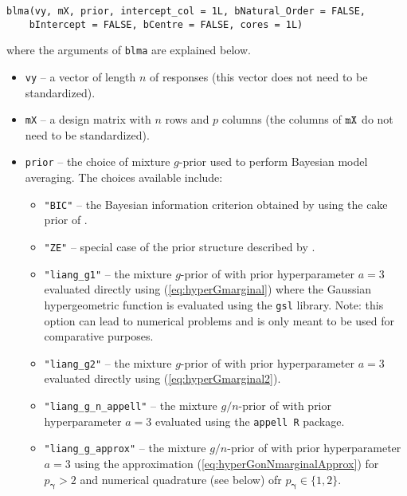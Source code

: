 \documentclass[12pt]{article}
\def\vectorfonttwo{\boldsymbol}
\def\vgamma{{\vectorfonttwo \gamma}}             %
\begin{document}
\begin{verbatim}
blma(vy, mX, prior, intercept_col = 1L, bNatural_Order = FALSE, 
    bIntercept = FALSE, bCentre = FALSE, cores = 1L)
\end{verbatim}

\noindent where the arguments of {\tt blma}
are explained below.
\begin{itemize}
	\item {\tt vy} -- a vector of length $n$ of responses (this vector does not need to be standardized).
	
	\item {\tt mX} -- a design matrix with $n$ rows and $p$ columns (the columns of ${\tt mX}$ do not need to be standardized).
	
	\item {\tt prior} -- the choice of mixture $g$-prior used to perform Bayesian model averaging. The choices available include:
	\begin{itemize}
		\item {\tt "BIC"} -- the Bayesian information criterion obtained by using the cake prior 
		of \cite{OrmerodEtal2017}. 
		
		\item {\tt "ZE"} -- special case of the prior structure described by \cite{Maruyama2011}.
		
		\item {\tt "liang\_g1"} -- the mixture $g$-prior of \cite{Liang2008} with prior hyperparameter $a=3$
		evaluated directly using (\ref{eq:hyperGmarginal}) where the Gaussian hypergeometric function is evaluated using the {\tt gsl} library. Note: this option can lead to numerical problems and is only meant to be used for comparative purposes.
		
		\item {\tt "liang\_g2"} -- the mixture $g$-prior of \cite{Liang2008} with prior hyperparameter $a=3$
		evaluated directly using (\ref{eq:hyperGmarginal2}).
		
		\item {\tt "liang\_g\_n\_appell"} -- the mixture $g/n$-prior of \cite{Liang2008} with prior hyperparameter $a=3$ evaluated using the {\tt appell R} package.
		
		\item {\tt "liang\_g\_approx"} -- the mixture $g/n$-prior of \cite{Liang2008} with prior hyperparameter $a=3$ using the approximation (\ref{eq:hyperGonNmarginalApprox}) for $p_\vgamma >2$ and
		numerical quadrature (see below) ofr $p_\vgamma\in \{1,2\}$.
		

\end{itemize}
\end{itemize}
\end{document}
